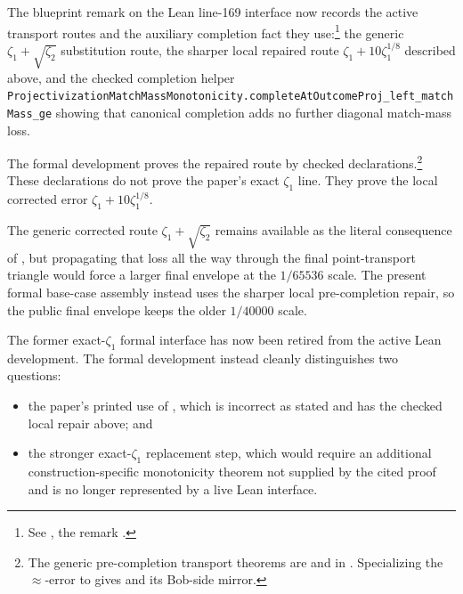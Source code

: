 \documentclass[11pt]{article}
\begin{document}
The blueprint remark on the Lean line-169 interface now records the active
transport routes and the auxiliary completion fact they use:\footnote{See
, the remark
.}
the generic $\zeta_1 + \sqrt{\zeta_2}$ substitution route, the sharper local
repaired route $\zeta_1 + 10\zeta_1^{1/8}$ described above, and the checked
completion helper
\texttt{ProjectivizationMatchMassMonotonicity.completeAtOutcomeProj\_left\_matchMass\_ge}
showing that canonical completion adds no further diagonal match-mass loss.

The formal development proves the repaired route by checked declarations.\footnote{The
generic pre-completion transport theorems are
and
in
.
Specializing the $\approx$-error to
gives
and its Bob-side mirror.}
These declarations do not prove the paper's exact $\zeta_1$ line.  They prove
the local corrected error $\zeta_1 + 10\zeta_1^{1/8}$.

The generic corrected route $\zeta_1 + \sqrt{\zeta_2}$ remains available as the
literal consequence of , but propagating that loss all
the way through the final point-transport triangle would force a larger final
envelope at the $1/65536$ scale.  The present formal base-case assembly instead
uses the sharper local pre-completion repair, so the public final envelope keeps
the older $1/40000$ scale.

The former exact-$\zeta_1$ formal interface has now been retired from the active
Lean development.  The formal development instead cleanly distinguishes two
questions:

\begin{itemize}
\item the paper's printed use of , which is incorrect as
  stated and has the checked local repair above; and
\item the stronger exact-$\zeta_1$ replacement step, which would require an
  additional construction-specific monotonicity theorem not supplied by the
  cited proof and is no longer represented by a live Lean interface.
\end{itemize}
\end{document}
